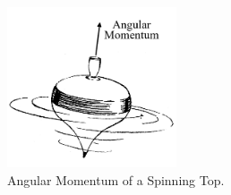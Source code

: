\documentclass[12pt]{report}
\providecommand{\DIFaddbeginFL}{} %
\providecommand{\DIFaddendFL}{} %
\providecommand{\DIFdelbeginFL}{} %
\providecommand{\DIFdelendFL}{} %
\begin{document}
\begin{figure}[ht!]
\captionsetup{justification=centering}
\centering
\includegraphics[width=50mm]{Chapter01/Top_(PSF)2.png}
\DIFdelbeginFL %
\DIFdelendFL \DIFaddbeginFL \caption[Angular Momentum of a Spinning Top]{\DIFaddendFL Angular Momentum of a Spinning Top.\protect\footnotemark}
\label{spintop}
\end{figure}
\end{document}
